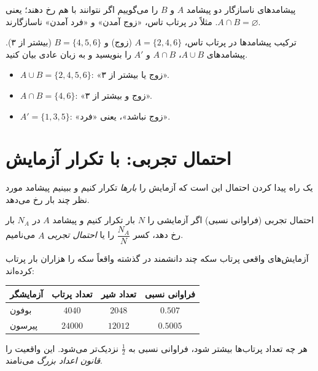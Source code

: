 \begin{definition}[label=hs:def:disjoint]{پیشامدهای ناسازگار}
دو پیشامد $A$ و $B$ را  می‌گوییم اگر نتوانند با هم رخ دهند؛ یعنی $A\cap B=\varnothing$. مثلاً در پرتاب تاس، «زوج آمدن» و «فرد آمدن» ناسازگارند.
\end{definition}

\begin{example}[label=hs:ex:combine]{ترکیب پیشامدها}
در پرتاب تاس، $A=\{2,4,6\}$ (زوج) و $B=\{4,5,6\}$ (بیشتر از ۳). پیشامدهای $A\cup B$، $A\cap B$ و $A'$ را بنویسید و به زبان عادی بیان کنید.
\begin{solution}
\begin{itemize}
  \item $A\cup B=\{2,4,5,6\}$: «زوج یا بیشتر از ۳».
  \item $A\cap B=\{4,6\}$: «زوج و بیشتر از ۳».
  \item $A'=\{1,3,5\}$: «زوج نباشد»، یعنی «فرد».
\end{itemize}
\end{solution}
\end{example}

\section{احتمال تجربی: با تکرار آزمایش}

یک راه پیدا کردن احتمال این است که آزمایش را \emph{بارها} تکرار کنیم و ببینیم پیشامد مورد نظر چند بار رخ می‌دهد.

\begin{definition}[label=hs:def:empirical]{احتمال تجربی (فراوانی نسبی)}
اگر آزمایشی را $N$ بار تکرار کنیم و پیشامد $A$ در $N_A$ بار رخ دهد، کسر $\dfrac{N_A}{N}$ را  یا \emph{احتمال تجربی} $A$ می‌نامیم.
\end{definition}

\begin{example}[label=hs:ex:coins-history]{آزمایش‌های واقعی پرتاب سکه}
چند دانشمند در گذشته واقعاً سکه را هزاران بار پرتاب کرده‌اند:
\begin{center}
\renewcommand{\arraystretch}{1.3}
\begin{tabular}{lccc}
\toprule
آزمایشگر & تعداد پرتاب & تعداد شیر & فراوانی نسبی \\
\midrule
بوفون & $4040$ & $2048$ & $0.507$ \\
پیرسون & $24000$ & $12012$ & $0.5005$ \\
\bottomrule
\end{tabular}
\end{center}
هر چه تعداد پرتاب‌ها بیشتر شود، فراوانی نسبی به $\tfrac12$ نزدیک‌تر می‌شود. این واقعیت را \emph{قانون اعداد بزرگ} می‌نامند.
\end{example}


